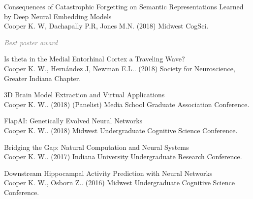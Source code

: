 \documentclass[10pt]{cooperCV2}
\begin{document}
\begin{etaremune}[itemindent=-1.5\bibhang, topsep=0pt,
				   itemsep=\bibsep,partopsep=0pt,parsep=0pt,leftmargin={\bibhang+\widthof{[999]}}]
	
    \item Consequences of Catastrophic Forgetting on Semantic Representations Learned by Deep Neural Embedding Models\\ Cooper K. W, Dachapally P.R, Jones M.N. (2018) Midwest CogSci. 
     
     	\begin{innerlist}
     	
	     \item  \textcolor{grey}{\textit{Best poster award} }
     	
     	\end{innerlist}
     
	
    \item Is theta in the Medial Entorhinal Cortex a Traveling Wave?\\ Cooper K. W., Hernández J, Newman E.L.. (2018) Society for Neuroscience, Greater Indiana Chapter. 
     
	
    \item 3D Brain Model Extraction and Virtual Applications\\ Cooper K. W.. (2018) (Panelist) Media School Graduate Association Conference. 
     
	
    \item FlapAI: Genetically Evolved Neural Networks\\ Cooper K. W.. (2018) Midwest Undergraduate Cognitive Science Conference. 
     
	
    \item Bridging the Gap: Natural Computation and Neural Systems\\ Cooper K. W.. (2017) Indiana University Undergraduate Research Conference. 
     
	
    \item Downstream Hippocampal Activity Prediction with Neural Networks\\ Cooper K. W., Osborn Z.. (2016) Midwest Undergraduate Cognitive Science Conference. 
     
	


\end{etaremune}








%	
\end{document}
